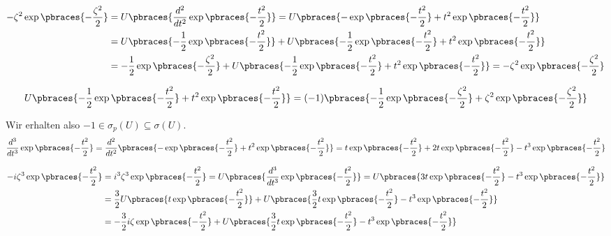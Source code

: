 \begin{solution}
\begin{align*}
  -\zeta^2 \exp \pbraces{-\frac{\zeta^2}{2}}
  & =
  U \pbraces
  {
    \frac{d^2}{dt^2}
    \exp \pbraces{-\frac{t^2}{2}}
  }
  =
  U \pbraces
  {
    -\exp \pbraces{-\frac{t^2}{2}} +
    t^2 \exp \pbraces{-\frac{t^2}{2}}
  } \\
  & =
  U \pbraces
  {
    -\frac{1}{2}
    \exp \pbraces{-\frac{t^2}{2}}
  } +
  U \pbraces
  {
    -\frac{1}{2}
    \exp \pbraces{-\frac{t^2}{2}} +
    t^2 \exp \pbraces{-\frac{t^2}{2}}
  } \\
  & =
  -\frac{1}{2} \exp \pbraces{-\frac{\zeta^2}{2}} +
  U \pbraces
  {
    -\frac{1}{2}
    \exp \pbraces{-\frac{t^2}{2}} +
    t^2 \exp \pbraces{-\frac{t^2}{2}}
  }
  =
  -\zeta^2 \exp \pbraces{-\frac{\zeta^2}{2}}
\end{align*}

\begin{align*}
  U \pbraces
  {
    -\frac{1}{2}
    \exp \pbraces{-\frac{t^2}{2}} +
    t^2 \exp \pbraces{-\frac{t^2}{2}}
  }
  =
  (-1) \pbraces
  {
    -\frac{1}{2}
    \exp \pbraces{-\frac{\zeta^2}{2}} +
    \zeta^2
    \exp \pbraces{-\frac{\zeta^2}{2}}
  }
\end{align*}

Wir erhalten also $-1 \in \sigma_p(U) \subseteq \sigma(U)$. \\

\begin{align*}
  \frac{d^3}{dt^3}
  \exp \pbraces{-\frac{t^2}{2}}
  =
  \frac{d^2}{dt^2}
  \pbraces
  {
    -\exp \pbraces{-\frac{t^2}{2}} +
    t^2 \exp \pbraces{-\frac{t^2}{2}}
  }
  =
  t \exp \pbraces{-\frac{t^2}{2}} +
  2 t \exp \pbraces{-\frac{t^2}{2}} -
  t^3 \exp \pbraces{-\frac{t^2}{2}}
\end{align*}

\begin{align*}
  -i \zeta^3 \exp \pbraces{-\frac{t^2}{2}}
  & =
  i^3 \zeta^3 \exp \pbraces{-\frac{t^2}{2}}
  =
  U \pbraces
  {
    \frac{d^3}{dt^3}
    \exp \pbraces{-\frac{t^2}{2}}
  }
  =
  U \pbraces
  {
    3 t \exp \pbraces{-\frac{t^2}{2}} -
    t^3 \exp \pbraces{-\frac{t^2}{2}}
  } \\
  & =
  \frac{3}{2}
  U \pbraces{t \exp \pbraces{-\frac{t^2}{2}}} +
  U \pbraces
  {
    \frac{3}{2}
    t \exp \pbraces{-\frac{t^2}{2}} -
    t^3 \exp \pbraces{-\frac{t^2}{2}}
  } \\
  & =
  -\frac{3}{2} i \zeta \exp \pbraces{-\frac{t^2}{2}} +
  U \pbraces
  {
    \frac{3}{2}
    t \exp \pbraces{-\frac{t^2}{2}} -
    t^3 \exp \pbraces{-\frac{t^2}{2}}
  }
\end{align*}


\end{solution}
